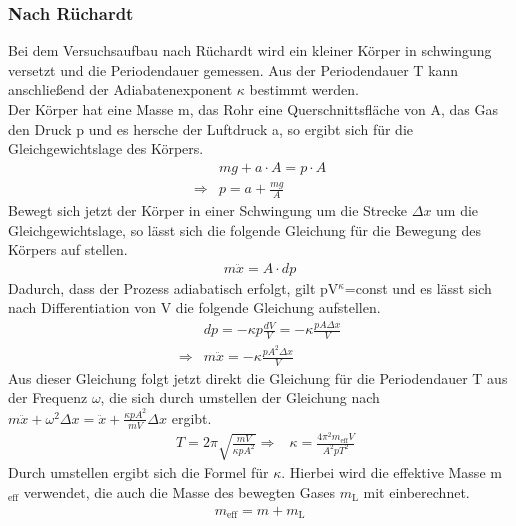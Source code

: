 \documentclass[12pt,a4paper,titlepage,headinclude,bibtotoc]{scrartcl}
\begin{document}
\subsubsection{Nach Rüchardt}
Bei dem Versuchsaufbau nach Rüchardt wird ein kleiner Körper in schwingung versetzt und die Periodendauer gemessen.
Aus der Periodendauer T kann anschließend der Adiabatenexponent $\kappa$ bestimmt werden.\\
Der Körper hat eine Masse m, das Rohr eine Querschnittsfläche von A, das Gas den Druck p und es hersche der Luftdruck a, so ergibt sich für die Gleichgewichtslage des Körpers.
\begin{align}
	& mg + a\cdot A = p \cdot A\\
	\Rightarrow & p=a+\frac{mg}{A}
\end{align}
Bewegt sich jetzt der Körper in einer Schwingung um die Strecke $\Delta x$ um die Gleichgewichtslage, so lässt sich die folgende Gleichung für die Bewegung des Körpers auf stellen.
\begin{align}
	m\ddot{x}=A\cdot dp
\end{align}
Dadurch, dass der Prozess adiabatisch erfolgt, gilt pV$^\kappa$=const und es lässt sich nach Differentiation von V die folgende Gleichung aufstellen.
\begin{align}
	& dp=-\kappa p \frac{dV}{V}=-\kappa \frac{pA\Delta x}{V}\\
	\Rightarrow & m \ddot{x}=-\kappa\frac{pA^2\Delta x}{V}
\end{align}
Aus dieser Gleichung folgt jetzt direkt die Gleichung für die Periodendauer T aus der Frequenz $\omega$, die sich durch umstellen der Gleichung nach $m\ddot{x}+\omega^2 \Delta x=\ddot{x} + \frac{\kappa pA^2}{mV}\Delta x$ ergibt.
\begin{align}
	& T = 2\pi\sqrt{\frac{mV}{\kappa pA^2}}
	\Rightarrow & \kappa = \frac{4\pi^2m_\text{eff}V}{A^2pT^2}
\end{align}
Durch umstellen ergibt sich die Formel für $\kappa$.
Hierbei wird die effektive Masse m$_\text{eff}$ verwendet, die auch die Masse des bewegten Gases $m_\text{L}$ mit einberechnet.
\begin{align}
	m_\text{eff} = m + m_\text{L}
\end{align}
\end{document}
